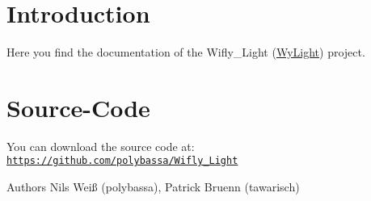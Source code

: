 \hypertarget{index_intro_sec}{}\section{Introduction}\label{index_intro_sec}
Here you find the documentation of the Wifly\-\_\-\-Light (\hyperlink{namespace_wy_light}{Wy\-Light}) project.\hypertarget{index_sourceCode}{}\section{Source-\/\-Code}\label{index_sourceCode}
You can download the source code at\-: \href{https://github.com/polybassa/Wifly_Light}{\tt https\-://github.\-com/polybassa/\-Wifly\-\_\-\-Light}

\begin{DoxyAuthor}{Authors}
Nils Weiß (polybassa), Patrick Bruenn (tawarisch) 
\end{DoxyAuthor}
